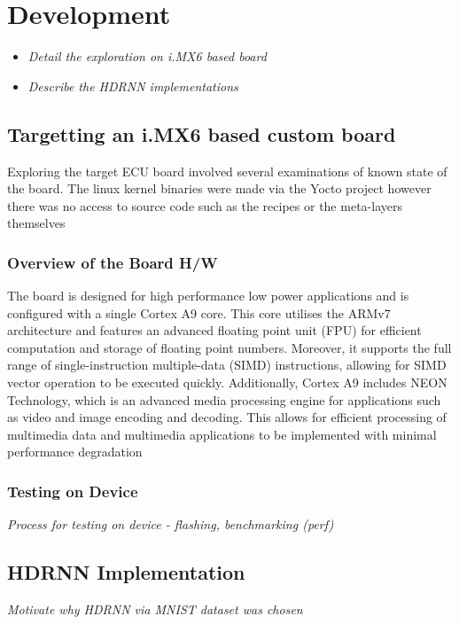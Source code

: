 \chapter{Development}

\begin{itemize}
	\item \textit{Detail the exploration on i.MX6 based board}
	\item \textit{Describe the HDRNN implementations}
\end{itemize}

\section[iMX6 Custom Board Target]{Targetting an i.MX6 based custom board}

Exploring the target ECU board involved several examinations of known state of the board. The linux kernel binaries were made via the Yocto project however there was no access to source code such as the recipes or the meta-layers themselves

\subsection{Overview of the Board H/W}
The board is designed for high performance low power applications and is configured with a single Cortex A9 core. This core utilises the ARMv7 architecture and features an advanced floating point unit (FPU) for efficient computation and storage of floating point numbers. Moreover, it supports the full range of single-instruction multiple-data (SIMD) instructions, allowing for SIMD vector operation to be executed quickly. Additionally, Cortex A9 includes NEON Technology, which is an advanced media processing engine for applications such as video and image encoding and decoding. This allows for efficient processing of multimedia data and multimedia applications to be implemented with minimal performance degradation

\subsection{Testing on Device}
\textit{Process for testing on device - flashing, benchmarking (perf)}

\section{HDRNN Implementation}
\textit{Motivate why HDRNN via MNIST dataset was chosen}

